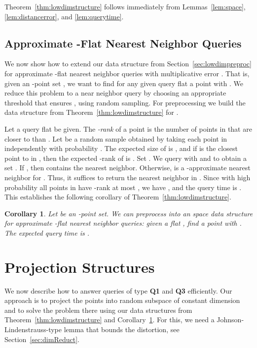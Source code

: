 \documentclass[a4paper,11pt]{paper}
\newtheorem{corollary}[theorem]{Corollary}
\begin{document}
Theorem~\ref{thm:lowdimstructure} follows immediately from
Lemmas~\ref{lem:space}, \ref{lem:distancerror}, and
\ref{lem:querytime}.

\subsection{Approximate -Flat Nearest Neighbor Queries}
\label{sec:approximateNNlowdim}
We now show how to extend our
data structure from Section~\ref{sec:lowdimpreproc}
for approximate -flat nearest neighbor queries with
multiplicative error .
That is, given an -point set
, we want to find for any
given query flat 
a point  with .
We reduce this problem to a near neighbor query by choosing an
appropriate
threshold  that ensures
, using random sampling.
For preprocessing we build the data structure  from
Theorem~\ref{thm:lowdimstructure} for .

Let a query flat  be given.
The \emph{-rank} of a point  is the number of
points in  that are closer to  than .
Let  be a random sample obtained by
taking each point in  independently with probability .
The expected size of  is , and if  is the
closest point
to  in , then the expected -rank of  is . Set
. We query
 with  and  to obtain a set .
If , then
 contains the nearest neighbor. Otherwise,  is a
-approximate nearest neighbor for .
Thus, it suffices to return the nearest neighbor in .
Since with high probability all
points in  have -rank at most ,
we have , and the query time is
.
This establishes the following corollary of
Theorem~\ref{thm:lowdimstructure}.
\begin{corollary}
\label{cor:lowdimapprox}
Let  be an -point set.
We can preprocess  into an
 space data structure
for approximate -flat nearest neighbor queries:
given a flat , find a point
 with .
The expected query time is
.
\end{corollary}

\section{Projection Structures}
\label{sec:projectionstructures}

We now describe how to answer queries of type
\textbf{Q1} and \textbf{Q3} efficiently. Our approach is
to project the points into  random subspace of constant dimension
and to solve the problem there using our data structures from
Theorem~\ref{thm:lowdimstructure} and
Corollary~\ref{cor:lowdimapprox}.
For this, we need a Johnson-Lindenstrauss-type lemma that bounds the
distortion, see Section~\ref{sec:dimReduct}.
\end{document}
